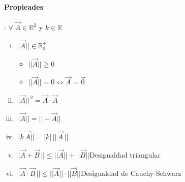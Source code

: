 \documentclass[11pt, twocolumn, landscape, a4paper]{article}
\begin{document}
\paragraph*{Propieades} : \quad$\forall\;\vec{A} \in \mathbb{R}^{2}$ y $k \in \mathbb{R}$ 
\begin{enumerate}[i.]
\item{$||\vec{A}|| \in \mathbb{R}_{0}^{+}$
\begin{itemize}
\item{$||\vec{A}|| \ge 0$}
\item{$||\vec{A}|| = 0 \iff \vec{A} = \vec{0}$}
\end{itemize}
}
\item{$||\vec{A}||^{\,2} = \vec{A} \cdot \vec{A}$}
\item{$||\vec{A}|| = ||- \vec{A}||$}
\item{$||k\,\vec{A}|| = |k|\,||\,\vec{A}\,||$}
\item{$||\vec{A} + \vec{B}\,|| \le ||\vec{A}|| + ||\vec{B}||$\qquad Desigualdad triangular}
\item{$||\vec{A} \cdot \vec{B}\,|| \le ||\vec{A}|| \cdot ||\vec{B}||$\qquad Desigualdad de Cauchy-Schwarz}
\end{enumerate}
\end{document}
